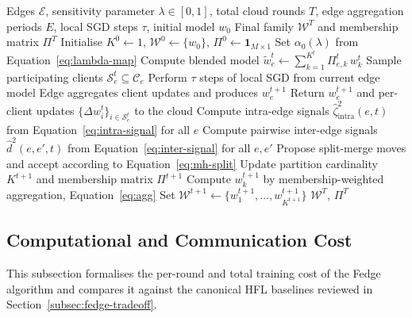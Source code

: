 \begin{algorithm}[!t]
\caption{Fedge}
\label{alg:fedge}
\begin{algorithmic}[1]
\Require Edges $\mathcal{E}$, sensitivity parameter $\lambda \in [0,1]$, total cloud rounds $T$, edge aggregation periods $E$, local SGD steps $\tau$, initial model $w_0$
\Ensure Final family $\mathcal{W}^{T}$ and membership matrix $\Pi^{T}$
\State Initialise $K^{0} \gets 1$, $\mathcal{W}^{0} \gets \{w_{0}\}$, $\Pi^{0} \gets \mathbf{1}_{M \times 1}$
\State Set $\alpha_{0}(\lambda)$ from Equation~\eqref{eq:lambda-map}
        \State Compute blended model $\tilde{w}_{e}^{t} \gets \sum_{k=1}^{K^{t}} \Pi_{e,k}^{t} \, w_{k}^{t}$
        \State Sample participating clients $\mathcal{S}_{e}^{t} \subseteq \mathcal{C}_{e}$
                \State Perform $\tau$ steps of local SGD from current edge model
            \EndFor
            \State Edge aggregates client updates and produces $w_{e}^{t+1}$
        \EndFor
        \State Return $w_{e}^{t+1}$ and per-client updates $\{\Delta w_{i}^{t}\}_{i \in \mathcal{S}_{e}^{t}}$ to the cloud
    \EndFor
    \State Compute intra-edge signals $\hat{\zeta}_{\text{intra}}^{2}(e, t)$ from Equation~\eqref{eq:intra-signal} for all $e$
    \State Compute pairwise inter-edge signals $\hat{d}^{2}(e, e', t)$ from Equation~\eqref{eq:inter-signal} for all $e, e'$
    \State Propose split-merge moves and accept according to Equation~\eqref{eq:mh-split}
    \State Update partition cardinality $K^{t+1}$ and membership matrix $\Pi^{t+1}$
        \State Compute $w_{k}^{t+1}$ by membership-weighted aggregation, Equation~\eqref{eq:agg}
    \EndFor
    \State Set $\mathcal{W}^{t+1} \gets \{w_{1}^{t+1}, \ldots, w_{K^{t+1}}^{t+1}\}$
\EndFor
\State \Return $\mathcal{W}^{T}$, $\Pi^{T}$
\end{algorithmic}
\end{algorithm}

\subsection{Computational and Communication Cost}
\label{subsec:fedge-cost}

This subsection formalises the per-round and total training cost of the Fedge algorithm and compares it against the canonical HFL baselines reviewed in Section~\ref{subsec:fedge-tradeoff}.


